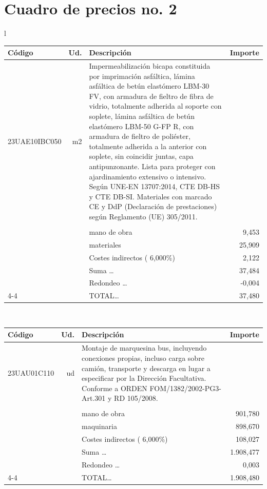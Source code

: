 \documentclass{book}%
\begin{document}
\part{Cuadro de precios no. 2}%
\label{sec:Cuadrodepreciosno.2}%
\parttoc%
\setcounter{chapter}{0}%
\small%
\begin{longtable}{l}%
\begin{tabular}{l r p{60mm} r}%
Código&Ud.&Descripción&Importe\\%
\hline%
23UAE10IBC050&m2&Impermeabilización bicapa constituida por imprimación asfáltica, lámina asfáltica de betún elastómero LBM{-}30 FV, con armadura de fieltro de fibra de vidrio, totalmente adherida al soporte con soplete, lámina asfáltica de betún elastómero LBM{-}50 G{-}FP R, con armadura de fieltro de poliéster, totalmente adherida a la anterior con soplete, sin coincidir juntas, capa antipunzonante. Lista para proteger con ajardinamiento extensivo o intensivo. Según UNE{-}EN 13707:2014, CTE DB{-}HS y CTE DB{-}SI. Materiales con marcado CE y DdP (Declaración de prestaciones) según Reglamento (UE) 305/2011.&\\%
&&&\\%
&&mano de obra&     9,453\\%
&&materiales&    25,909\\%
&&Costes indirectos (     6,000\%)&     2,122\\%
&&Suma \ldots&    37,484\\%
&&Redondeo \ldots&    {-}0,004\\%
\cline{4-4}%
&&TOTAL\ldots&    37,480\\%
\end{tabular}\\%
\begin{tabular}{l r p{60mm} r}%
Código&Ud.&Descripción&Importe\\%
\hline%
23UAU01C110&ud&Montaje de marquesina bus, incluyendo conexiones propias, incluso carga sobre camión, transporte y descarga en lugar a especificar por la Dirección Facultativa. Conforme a ORDEN FOM/1382/2002{-}PG3{-}Art.301 y RD 105/2008.&\\%
&&&\\%
&&mano de obra&   901,780\\%
&&maquinaria&   898,670\\%
&&Costes indirectos (     6,000\%)&   108,027\\%
&&Suma \ldots& 1.908,477\\%
&&Redondeo \ldots&     0,003\\%
\cline{4-4}%
&&TOTAL\ldots& 1.908,480\\%

\end{tabular}
\end{longtable}
\end{document}
